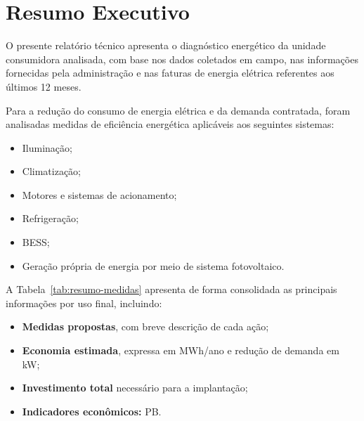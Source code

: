 \chapter{Resumo Executivo}


O presente relatório técnico apresenta o diagnóstico energético da unidade consumidora analisada, com base nos dados coletados em campo, nas informações fornecidas pela administração e nas faturas de energia elétrica referentes aos últimos 12 meses.

Para a redução do consumo de energia elétrica e da demanda contratada, foram analisadas medidas de eficiência energética aplicáveis aos seguintes sistemas:


\begin{itemize}
    \item Iluminação;
    \item Climatização;
    \item Motores e sistemas de acionamento;
    \item Refrigeração;
    \item \ac{BESS};
    \item Geração própria de energia por meio de sistema fotovoltaico.
\end{itemize}

A Tabela~\ref{tab:resumo-medidas} apresenta de forma consolidada as principais informações por uso final, incluindo:

\begin{itemize}
    \item \textbf{Medidas propostas}, com breve descrição de cada ação;
    \item \textbf{Economia estimada}, expressa em MWh/ano e redução de demanda em kW;
    \item \textbf{Investimento total} necessário para a implantação;
    \item \textbf{Indicadores econômicos:} \ac{PB}.
\end{itemize}

\clearpage


